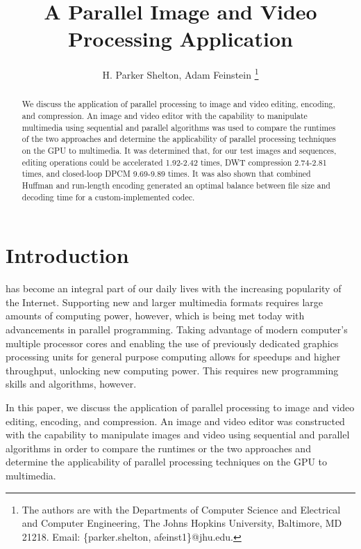 \documentclass[10pt,twocolumn,twoside]{IEEEtran}
\begin{document}
\title{A Parallel Image and Video Processing Application}
\author{H. Parker Shelton, Adam Feinstein
\thanks{The authors are with the Departments of Computer Science and Electrical and Computer Engineering, The Johns Hopkins University, Baltimore, MD 21218.
Email: \{parker.shelton, afeinst1\}@jhu.edu.}}

\maketitle
\vskip -20pt

\begin{abstract}
We discuss the application of parallel processing to image and video editing, encoding, and compression. An image and video editor with the capability to manipulate multimedia using sequential and parallel algorithms was used to compare the runtimes of the two approaches and determine the applicability of parallel processing techniques on the GPU to multimedia. It was determined that, for our test images and sequences, editing operations could be accelerated 1.92-2.42 times, DWT compression 2.74-2.81 times, and closed-loop DPCM 9.69-9.89 times. It was also shown that combined Huffman and run-length encoding generated an optimal balance between file size and decoding time for a custom-implemented codec.
\end{abstract}

\section{Introduction}
 has become an integral part of our daily lives with the increasing popularity of the Internet. Supporting new and larger multimedia formats requires large amounts of computing power, however, which is being met today with advancements in parallel programming. Taking advantage of modern computer's multiple processor cores and enabling the use of previously dedicated graphics processing units for general purpose computing allows for speedups and higher throughput, unlocking new computing power. This requires new programming skills and algorithms, however.

In this paper, we discuss the application of parallel processing to image and video editing, encoding, and compression. An image and video editor was constructed with the capability to manipulate images and video using sequential and parallel algorithms in order to compare the runtimes or the two approaches and determine the applicability of parallel processing techniques on the GPU to multimedia.
\end{document}

